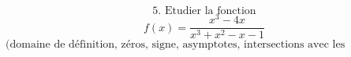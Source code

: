 \documentclass{article}
\begin{document}
\[ \text{5. Etudier la fonction} \]
\[ f(x) = \frac{x^3 - 4x}{x^3 + x^2 - x - 1} \]
\[ \text{(domaine de définition, zéros, signe, asymptotes, intersections avec les asymptotes, graphe.)} \]
\end{document}
